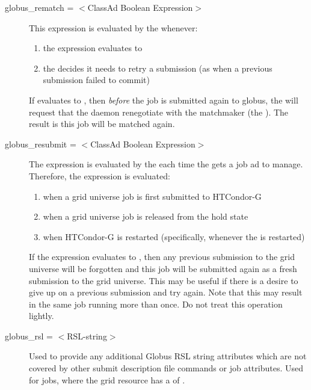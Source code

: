 \begin{description}
\label{condor-submit-globus-rematch}
\item[globus\_rematch = $<$ClassAd Boolean Expression$>$]
\label{condor-submit-globus-rematch}
This expression is evaluated by the  whenever:
\begin{enumerate}
\item
   the  expression evaluates to 
\item
   the  decides it needs to retry a submission
   (as when a previous submission failed to commit)
\end{enumerate}
If  evaluates to ,
then \emph{before} the job is submitted again to globus,
the  will request that the 
daemon renegotiate
with the matchmaker (the ).
The result is this job will be matched again.


\label{condor-submit-globus-resubmit}
\item[globus\_resubmit = $<$ClassAd Boolean Expression$>$]
The expression is evaluated by the  each time
the  gets a job ad to manage.
Therefore, the expression is evaluated:
\begin{enumerate}
\item
   when a grid universe job is first submitted to HTCondor-G
\item
   when a grid universe job is released from the hold state
\item
   when HTCondor-G is restarted (specifically, whenever the 
   is restarted)
\end{enumerate}
If the expression evaluates to ,
then any previous submission to the grid universe will be
forgotten and this job will be submitted again as a fresh submission to
the grid universe.
This may be useful if there is a desire to give up on a
previous submission and try again.
Note that this may result in the same job running more than
once.  Do not treat this operation lightly.


\label{condor-submit-globus-rsl}
\item[globus\_rsl = $<$RSL-string$>$]
Used to provide any additional Globus RSL
string attributes which are not covered by other submit description
file commands or job attributes. Used for  
jobs, where the grid resource has a  of
.


\end{description}
